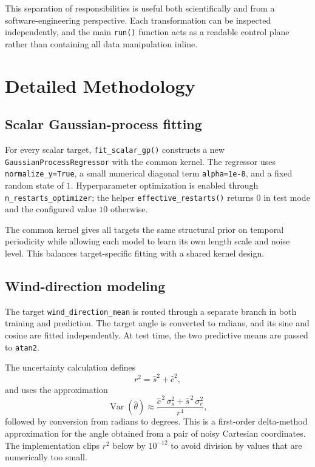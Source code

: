 \documentclass[11pt,a4paper]{article}
\newcommand{\code}[1]{\texttt{#1}}
\begin{document}
This separation of responsibilities is useful both scientifically and from a software-engineering perspective. Each transformation can be inspected independently, and the main \code{run()} function acts as a readable control plane rather than containing all data manipulation inline.

\section{Detailed Methodology}
\subsection{Scalar Gaussian-process fitting}
For every scalar target, \code{fit\_scalar\_gp()} constructs a new \code{GaussianProcessRegressor} with the common kernel. The regressor uses \code{normalize\_y=True}, a small numerical diagonal term \code{alpha=1e-8}, and a fixed random state of $1$. Hyperparameter optimization is enabled through \code{n\_restarts\_optimizer}; the helper \code{effective\_restarts()} returns $0$ in test mode and the configured value $10$ otherwise.

The common kernel gives all targets the same structural prior on temporal periodicity while allowing each model to learn its own length scale and noise level. This balances target-specific fitting with a shared kernel design.

\subsection{Wind-direction modeling}
The target \code{wind\_direction\_mean} is routed through a separate branch in both training and prediction. The target angle is converted to radians, and its sine and cosine are fitted independently. At test time, the two predictive means are passed to \code{atan2}.

The uncertainty calculation defines
\begin{equation}
 r^2 = \hat{s}^2 + \hat{c}^2,
\end{equation}
and uses the approximation
\begin{equation}
 \operatorname{Var}(\hat{\theta}) \approx
 \frac{\hat{c}^{\,2}\,\sigma_s^2 + \hat{s}^{\,2}\,\sigma_c^2}{r^4},
\end{equation}
followed by conversion from radians to degrees. This is a first-order delta-method approximation for the angle obtained from a pair of noisy Cartesian coordinates. The implementation clips $r^2$ below by $10^{-12}$ to avoid division by values that are numerically too small.
\end{document}
